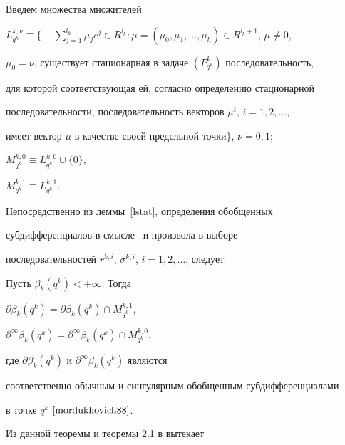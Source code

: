 Введем множества множителей


$L^{k, \nu}_{q^k}\equiv\Big\{-\sum\limits_{j=1}^{l_k}\mu_je^j\in R^{l_k}: 


\mu=(\mu_0,\mu_1,\dotsc,\mu_{l_l})\in R^{l_k+1}$, $\mu\neq 0$,  


$\mu_0=\nu$, существует стационарная в задаче $(P^k_{q^k})$ последовательность,


для которой соответствующая ей, согласно определению стационарной 


последовательности, последовательность векторов $\mu^i$, $i=1,2,\dotsc$,


имеет вектор $\mu$ в качестве своей предельной точки$\Big\}$, $\nu=0,1$;


$M^{k, 0}_{q^k}\equiv L^{k, 0}_{q^k}\cup\{0\}$,


$M^{k, 1}_{q^k}\equiv L^{k, 1}_{q^k}$. 


Непосредственно из леммы~\ref{lstat}, определения обобщенных 


субдифференциалов в смысле~\cite{mordukhovich88} и произвола в выборе


последовательностей $r^{k,i}$, $\sigma^{k,i}$, $i=1,2,\dotsc$, следует








\begin{thms}\label{subd}


Пусть $\beta_k(q^k)<+\infty$. Тогда


$\partial\beta_k(q^k)=\partial\beta_k(q^k)\cap M^{k, 1}_{q^k}$,


$\partial^\infty\beta_k(q^k)=\partial^\infty\beta_k(q^k)\cap M^{k, 0}_{q^k}$,


где $\partial\beta_k(q^k)$ и $\partial^\infty\beta_k(q^k)$ являются


соответственно обычным и сингулярным обобщенным субдифференциалами 


в точке $q^k$ $\cite{mordukhovich88}$.


\end{thms}





Из данной теоремы и теоремы 2.1 в \cite{mordukhovich88} вытекает








